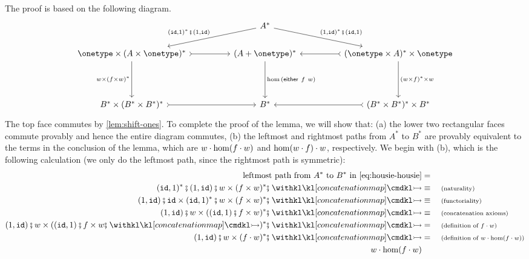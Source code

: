 The proof is based on the following diagram.
\begin{equation}
\label{eq:housie-housie}
    \begin{tikzcd}
        [column sep=huge]
 &  A^*
    \ar[dl, "{\appendoneterm^*\comp \prependoneterm}"']
    \ar[dr, "{\prependoneterm^*\comp \appendoneterm}"]
   \\
    \onetype \times (A \times\onetype)^* 
    \ar[dd,"w \times (f \times w)^*"']
    \ar[r, \concar ]
    &
            (A + \onetype)^*
    \ar[dd,"{\hom{(\either{f}{w})}}"]    
    &
    (\onetype \times A)^* \times \onetype    %
    \ar[dd,"(w \times f)^* \times w"]
    \ar[l, \concar]
    \\
    &
\ 
    \\
    B^* \times (B^* \times B^*)^*
    \ar[r,\concar]
    &
    B^*
    & 
    (B^* \times B^*)^* \times B^*
    \ar[l,\concar]
    \end{tikzcd}
\end{equation}
The top face commutes by \cref{lem:shift-ones}.
To complete the proof of the lemma, we will show that: (a) the lower two rectangular faces commute provably and hence the entire diagram commutes, (b) the leftmost and rightmost paths from $A^*$ to $B^*$ are provably equivalent to the terms in the conclusion of the lemma, which are $w \cdot \hom(f \cdot w)$ and  
$\hom(w \cdot f) \cdot w$, respectively. 
We begin with (b), which is the following calculation (we only do the leftmost path, since the rightmost path is symmetric):
\begin{align*}
\text{leftmost path from $A^*$ to $B^*$ in \eqref{eq:housie-housie}}  & = \\
\appendoneterm^*\comp \prependoneterm\comp w \times (f \times w)^*\comp \concmap  \equalbecause{naturality}\\
\prependoneterm\comp \idterm \times \appendoneterm^*\comp  w \times (f \times w)^*\comp \concmap  \equalbecause{functoriality}\\
\prependoneterm\comp  w \times (\appendoneterm\comp f \times w)^*\comp \concmap  \equalbecause{concatenation axioms}\\
\prependoneterm\comp  w \times (\appendoneterm\comp f \times w\comp \concmap)^*\comp \concmap  &= \why{definition of $f \wdot w$}\\
\prependoneterm\comp  w \times (f \wdot w)^*\comp \concmap  &= \why{definition of $w \wdot \hom(f \wdot w)$}\\
w \wdot \hom(f \wdot w)
\end{align*}
